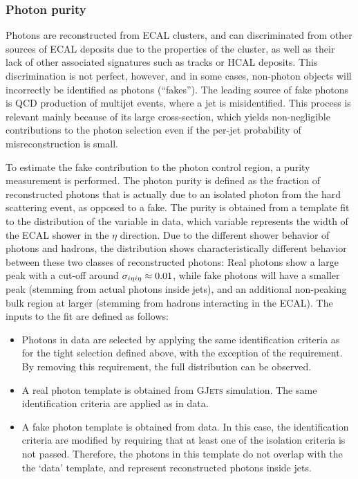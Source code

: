 \subsubsection{Photon purity}
Photons are reconstructed from ECAL clusters, and can discriminated from other sources of ECAL deposits due to the properties of the cluster, as well as their lack of other associated signatures such as tracks or HCAL deposits. This discrimination is not perfect, however, and in some cases, non-photon objects will incorrectly be identified as photons (``fakes''). The leading source of fake photons is QCD production of multijet events, where a jet is misidentified. This process is relevant mainly because of its large cross-section, which yields non-negligible contributions to the photon selection even if the per-jet probability of misreconstruction is small.

To estimate the fake contribution to the photon control region, a purity measurement is performed. The photon purity is defined as the fraction of reconstructed photons that is actually due to an isolated photon from the hard scattering event, as opposed to a fake. The purity is obtained from a template fit to the distribution of the \sieie variable in data, which \sieie variable represents the width of the ECAL shower in the $\eta$ direction. Due to the different shower behavior of photons and hadrons, the \sieie distribution shows characteristically different behavior between these two classes of reconstructed photons: Real photons show a large peak with a cut-off around $\sigma_{i\eta i\eta}\approx0.01$, while fake photons will have a smaller peak (stemming from actual photons inside jets), and an additional non-peaking bulk region at larger \sieie (stemming from hadrons interacting in the ECAL). The inputs to the fit are defined as follows:

\begin{itemize}
\item Photons in data are selected by applying the same identification criteria as for the tight selection defined above, with the exception of the \sieie requirement. By removing this requirement, the full \sieie distribution can be observed.
\item A real photon template is obtained from \textsc{GJets} simulation. The same identification criteria are applied as in data.
\item A fake photon template is obtained from data. In this case, the identification criteria are modified by requiring that at least one of the isolation criteria is not passed. Therefore, the photons in this template do not overlap with the the `data' template, and represent reconstructed photons inside jets.
\end{itemize}

